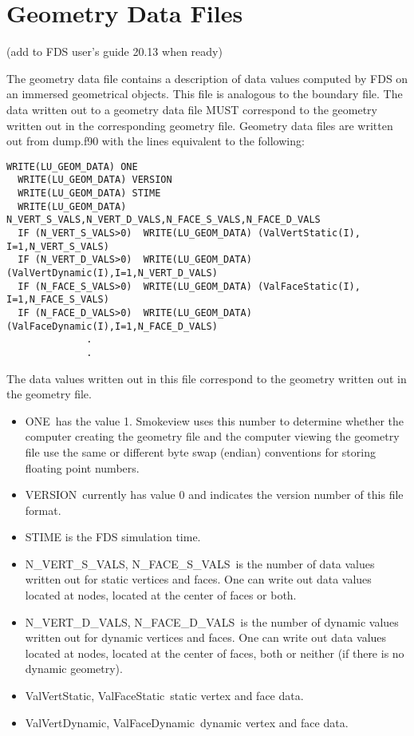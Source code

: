 \documentclass[12pt]{article}
\begin{document}
\vspace{\baselineskip}

\section{Geometry Data Files}
\label{out:GEOMETRY_DATA}

(add to FDS user's guide 20.13 when ready)

The geometry data file contains a description of data values computed by FDS on an immersed
geometrical objects.  This file is analogous to the boundary file.
The data written out to a geometry data file MUST correspond to the geometry written out
in the corresponding geometry file.
Geometry data files are written out from {\ct dump.f90} with the lines equivalent to the following:
\begin{lstlisting}[basicstyle=\scriptsize\ttfamily]
  WRITE(LU_GEOM_DATA) ONE
  WRITE(LU_GEOM_DATA) VERSION
  WRITE(LU_GEOM_DATA) STIME
  WRITE(LU_GEOM_DATA) N_VERT_S_VALS,N_VERT_D_VALS,N_FACE_S_VALS,N_FACE_D_VALS
  IF (N_VERT_S_VALS>0)  WRITE(LU_GEOM_DATA) (ValVertStatic(I), I=1,N_VERT_S_VALS)
  IF (N_VERT_D_VALS>0)  WRITE(LU_GEOM_DATA) (ValVertDynamic(I),I=1,N_VERT_D_VALS)
  IF (N_FACE_S_VALS>0)  WRITE(LU_GEOM_DATA) (ValFaceStatic(I), I=1,N_FACE_S_VALS)
  IF (N_FACE_D_VALS>0)  WRITE(LU_GEOM_DATA) (ValFaceDynamic(I),I=1,N_FACE_D_VALS)
              .
              .
\end{lstlisting}
The data values written out in this file correspond to the geometry written out in the geometry file.
\begin{itemize}
\item {\ct ONE}\ has the value 1. Smokeview uses this number to determine whether the computer creating the geometry file and the computer viewing the geometry file use the same or different byte swap (endian) conventions for storing floating point numbers.
\item {\ct VERSION}\ currently has value 0 and indicates the version number of this file format.
\item {\ct STIME} is the FDS simulation time.
\item {\ct N\_VERT\_S\_VALS, N\_FACE\_S\_VALS}\ is the number of data values written out for static vertices and faces.  One can write out data values located at nodes, located at the center of faces or both.
\item {\ct N\_VERT\_D\_VALS, N\_FACE\_D\_VALS}\ is the number of dynamic values written out for dynamic vertices and faces.  One can write out data values located at nodes, located at the center of faces, both or neither (if there is no dynamic geometry).
\item {\ct ValVertStatic, ValFaceStatic}\ static vertex and face data.
\item {\ct ValVertDynamic, ValFaceDynamic}\ dynamic vertex and face data.
\end{itemize}
\end{document}
